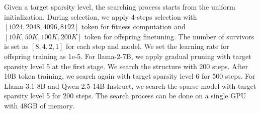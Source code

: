 Given a target sparsity level, the searching process starts from the uniform initialization. During selection, we apply 4-steps selection with $[1024, 2048, 4096, 8192]$ token for fitness computation and $[10K, 50K, 100K, 200K]$ token for offspring finetuning. The number of survivors is set as $[8,4,2,1]$ for each step and model.  We set the learning rate for offspring training as 1e-5. For llama-2-7B, we apply gradual pruning with target sparsity level 5 at the first stage. We search the structure with 200 steps. After 10B token training, we search again with target sparsity level 6 for 500 steps. For Llama-3.1-8B and Qwen-2.5-14B-Instruct, we search the sparse model with target sparsity level 5 for 200 steps. The search process can be done on a single GPU with 48GB of memory.


\begin{table}[h]
    \centering
    \caption{Hyper-parameter details for post-training on \sysname-2.6B, \sysname-4.4B, and \sysname-8.4B.}
    \label{tab:hyperparam}
\end{table}






    
